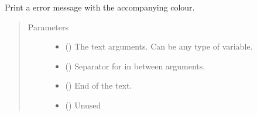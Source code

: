 \documentclass[letterpaper,10pt,english]{sphinxmanual}
\begin{document}
\begin{fulllineitems}
\label{\detokenize{EntroPass:EntroPass.print_utils.error}}
\sphinxAtStartPar
Print a error message with the accompanying colour.
\begin{quote}\begin{description}
\item[{Parameters}] \leavevmode\begin{itemize}
\item {} 
\sphinxAtStartPar
{} () \textendash{} The text arguments. Can be any type of variable.

\item {} 
\sphinxAtStartPar
{} (\sphinxstyleliteralemphasis{\sphinxupquote{, }}) \textendash{} Separator for in between arguments.

\item {} 
\sphinxAtStartPar
{} (\sphinxstyleliteralemphasis{\sphinxupquote{, }}) \textendash{} End of the text.

\item {} 
\sphinxAtStartPar
{} () \textendash{} Unused

\end{itemize}

\end{description}\end{quote}

\end{fulllineitems}

\end{document}
